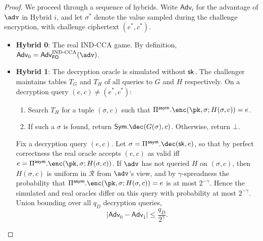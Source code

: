 \begin{proof}
    We proceed through a sequence of hybrids. Write $\mathsf{Adv}_i$ for the advantage of $\adv$ in Hybrid $i$, and let $\sigma^*$ denote the value sampled during the challenge encryption, with challenge ciphertext $(e^*, c^*)$.

    \begin{itemize}
        \item \textbf{Hybrid 0}: The real IND-CCA game. By definition, $\mathsf{Adv}_0 = \mathsf{Adv}^{\text{IND-CCA}}_{\mathsf{FO}}(\adv)$.

        \item \textbf{Hybrid 1}: The decryption oracle is simulated without $\mathsf{sk}$. The challenger maintains tables $T_G$ and $T_H$ of all queries to $G$ and $H$ respectively. On a decryption query $(e, c) \neq (e^*, c^*)$:
              \begin{enumerate}
                  \item Search $T_H$ for a tuple $(\sigma, c)$ such that $\Pi^{\mathsf{asym}}.\enc(\pk, \sigma; H(\sigma, c)) = e$.
                  \item If such a $\sigma$ is found, return $\mathsf{Sym}.\dec(G(\sigma), c)$. Otherwise, return $\bot$.
              \end{enumerate}
              Fix a decryption query $(e, c)$. Let $\sigma = \Pi^{\mathsf{asym}}.\dec(\sk, e)$, so that by perfect correctness the real oracle accepts $(e, c)$ as valid iff $e = \Pi^{\mathsf{asym}}.\enc(\pk, \sigma; H(\sigma, c))$. If $\adv$ has not queried $H$ on $(\sigma, c)$, then $H(\sigma, c)$ is uniform in $\mathcal{R}$ from $\adv$'s view, and by $\gamma$-spreadness the probability that $\Pi^{\mathsf{asym}}.\enc(\pk, \sigma; H(\sigma, c)) = e$ is at most $2^{-\gamma}$. Hence the simulated and real oracles differ on this query with probability at most $2^{-\gamma}$. Union bounding over all $q_D$ decryption queries,
              \[
                  |\mathsf{Adv}_0 - \mathsf{Adv}_1| \leq \frac{q_D}{2^\gamma}.
              \]


\end{itemize}
\end{proof}
